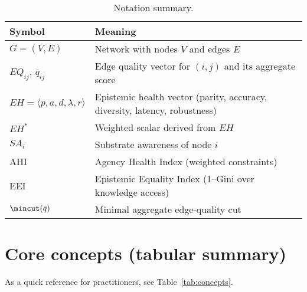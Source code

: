 \documentclass[12pt]{article}
\begin{document}
\begin{table}[htbp]
\centering
\small
\caption{Notation summary.}
\label{tab:notation}
\begin{tabularx}{\linewidth}{lY}
\toprule
\textbf{Symbol} & \textbf{Meaning} \\
\midrule
$G=(V,E)$ & Network with nodes $V$ and edges $E$ \\
$EQ_{ij}$, $\bar q_{ij}$ & Edge quality vector for $(i,j)$ and its aggregate score \\
$EH=\langle p,a,d,\lambda,r\rangle$ & Epistemic health vector (parity, accuracy, diversity, latency, robustness) \\
$EH^{\ast}$ & Weighted scalar derived from $EH$ \\
$SA_i$ & Substrate awareness of node $i$ \\
AHI & Agency Health Index (weighted constraints) \\
EEI & Epistemic Equality Index (1--Gini over knowledge access) \\
$\mincut(\bar q)$ & Minimal aggregate edge-quality cut \\
\bottomrule
\end{tabularx}
\end{table}

\section{Core concepts (tabular summary)}
As a quick reference for practitioners, see Table~\ref{tab:concepts}.
\label{sec:concepts}
\setlength{\extrarowheight}{2pt}
\setlength{\tabcolsep}{6pt}
\end{document}
